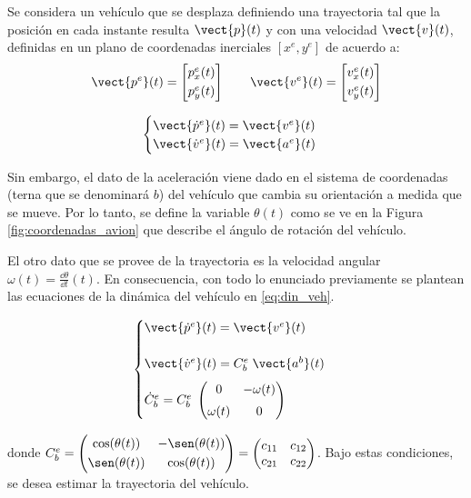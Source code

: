 
	Se considera un vehículo que se desplaza definiendo una trayectoria tal que la posición en cada instante resulta $\vect{p}(t)$ y con una velocidad $\vect{v}(t)$, definidas en un plano de coordenadas inerciales $[x^e,y^e]$ de acuerdo a:
	\begin{equation*}
		\vect{p^e}(t) = \begin{bmatrix} p^e_x(t) \\[0.3em] p^e_y(t) \end{bmatrix} \qquad%
		\vect{v^e}(t) = \begin{bmatrix} v^e_x(t) \\[0.3em] v^e_y(t) \end{bmatrix}
	\end{equation*}

	\begin{equation}
		\begin{cases}
			\vect{\dot{p}^e}(t) = \vect{v^e}(t)\\
			\vect{\dot{v}^e}(t) = \vect{a^e}(t)\\
		\end{cases}
		\label{eq:din_inercial}
	\end{equation}

	Sin embargo, el dato de la aceleración viene dado en el sistema de coordenadas (terna que se denominará $b$) del vehículo que cambia su orientación a medida que se mueve. Por lo tanto, se define la variable $\theta(t)$ como se ve en la Figura \ref{fig:coordenadas_avion} que describe el ángulo de rotación del vehículo.

	El otro dato que se provee de la trayectoria es la velocidad angular $\omega(t) = \frac{\dd \theta}{\dd t} (t)$. En consecuencia, con todo lo enunciado previamente se plantean las ecuaciones de la dinámica del vehículo en \eqref{eq:din_veh}.

	\begin{equation}
		\begin{cases}
			\vect{\dot{p}^e}(t) = \vect{v^e}(t)\\[1.4em]
			\vect{\dot{v}^e}(t) = C^e_b \; \vect{a^b}(t)\\[0.6em]
			\dot{C}^e_b = {C}^e_b \; \begin{pmatrix} 0& -\omega(t)\\[0.3em] \omega(t)&0 \end{pmatrix}
		\end{cases}
		\label{eq:din_veh}
	\end{equation}

	donde $C^e_b = \begin{pmatrix} \cos(\theta(t)) & -\sen(\theta(t))\\[0.3em] \sen(\theta(t)) & \cos(\theta(t))\end{pmatrix} = \begin{pmatrix} c_{11}&c_{12}\\c_{21}&c_{22}\end{pmatrix}$. Bajo estas condiciones, se desea estimar la trayectoria del vehículo.




